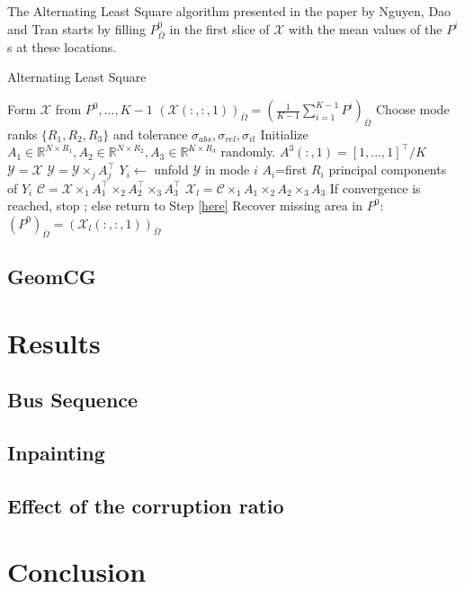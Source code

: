 \documentclass[a4paper, 11pt]{article} %
\def \X {\mathcal{X}}
\def \R {\mathbb{R}}
\def \t {\times}
\def \Y {\mathcal{Y}}
\def \C {\mathcal{C}}
\def \Xl {\mathcal{X}_{l}}
\def \bO{\bar{\Omega}}
\begin{document}
The Alternating Least Square algorithm presented in the paper by Nguyen, Dao and Tran \cite{ALS} starts by filling $P^0_{\bO}$ in the first slice of $\X$ with the mean values of the $P^i$s at these locations.

\begin{algorithm}
\caption{Alternating Least Square}\label{HOSVD}
\begin{algorithmic}[1]
\State Form $\X$ from $P^0,...,K-1$ 
\State $(\X(:,:,1))_{\bO}=(\frac{1}{K-1}\sum_{i=1}^{K-1}P^i)_{\bO}$
\State Choose mode ranks $\{R_1, R_2, R_3\}$ and tolerance $\sigma_{abs}, \sigma_{rel}, \sigma_{it}$
\State Initialize $A_1 \in \R^{N\t R_1}, A_2\in \R^{N\t R_2}, A_3\in \R^{K\t R_3}$ randomly.
\State $A^3(:,1)=[1,...,1]^{\top}/K$ \label{here}
\State $\Y=\X$
	\State $\Y=\Y\t_j A_j^\top$
\EndFor
\State$Y_i\gets$  unfold $\Y$ in mode $i$
\State $A_i$=first $R_i$ principal components of $Y_i$
\EndFor
\State $\C=\X\t_1 A_1^{\top}\t_2 A_2^{\top}\t_3 A_3^{\top}$
\State $\X_l=\C\t_1 A_1 \t_2 A_2 \t_3 A_3$
\State If convergence is reached, stop ; else return to Step \ref{here}
\State Recover missing area in $P^0$: $(P^0)_{\bO}=(\Xl(:,:,1))_{\bO}$
\end{algorithmic}
\end{algorithm}



\subsection{GeomCG}

\section{Results}

\subsection{Bus Sequence}
\subsection{Inpainting}
\subsection{Effect of the corruption ratio}

\section{Conclusion}
\end{document}
